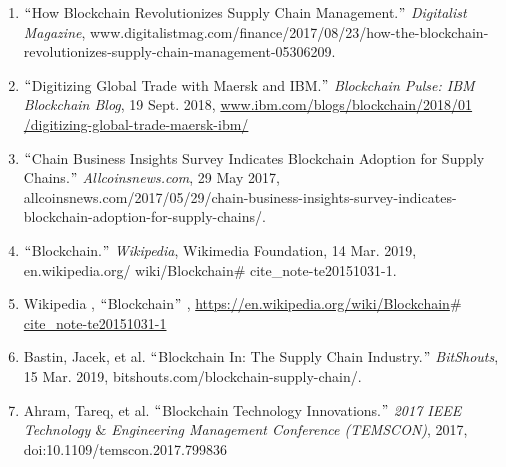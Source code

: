 \documentclass[12pt]{article}
\begin{document}
\begin{enumerate}
	\item {\fontsize{14pt}{16.8pt}\selectfont $``$How Blockchain Revolutionizes Supply Chain Management.$"$  \textit{Digitalist Magazine}, www.digitalistmag.com/finance/2017/08/23/how-the-blockchain-revolutionizes-supply-chain-management-05306209. \par}\par

	\item {\fontsize{14pt}{16.8pt}\selectfont $``$Digitizing Global Trade with Maersk and IBM.$"$  \textit{Blockchain Pulse: IBM Blockchain Blog}, 19 Sept. 2018, \href{http://www.ibm.com/blogs/blockchain/2018/01/digitizing-global-trade-maersk-ibm/}{\textcolor[HTML]{1155CC}{www.ibm.com/blogs/blockchain/2018/01 /digitizing-global-trade-maersk-ibm/}}\par}\par

	\item {\fontsize{14pt}{16.8pt}\selectfont $``$Chain Business Insights Survey Indicates Blockchain Adoption for Supply Chains.$"$  \textit{Allcoinsnews.com}, 29 May 2017, allcoinsnews.com/2017/05/29/chain-business-insights-survey-indicates-blockchain-adoption-for-supply-chains/. \par}\par

	\item {\fontsize{14pt}{16.8pt}\selectfont $``$Blockchain.$"$  \textit{Wikipedia}, Wikimedia Foundation, 14 Mar. 2019, en.wikipedia.org/ wiki/Blockchain$\#$ cite\_note-te20151031-1. \par}\par

	\item {\fontsize{14pt}{16.8pt}\selectfont Wikipedia , $``$Blockchain$"$ , \href{https://en.wikipedia.org/wiki/Blockchain#cite_note-te20151031-1}{\textcolor[HTML]{1155CC}{https://en.wikipedia.org/wiki/Blockchain$\#$ cite\_note-te20151031-1}}\par}\par

	\item {\fontsize{14pt}{16.8pt}\selectfont Bastin, Jacek, et al. $``$Blockchain In: The Supply Chain Industry.$"$  \textit{BitShouts}, 15 Mar. 2019, bitshouts.com/blockchain-supply-chain/. \par}\par

	\item {\fontsize{14pt}{16.8pt}\selectfont Ahram, Tareq, et al. $``$Blockchain Technology Innovations.$"$  \textit{2017 IEEE Technology $\&$  Engineering Management Conference (TEMSCON)}, 2017, doi:10.1109/temscon.2017.799836\par}\par


\end{enumerate}
\end{document}
